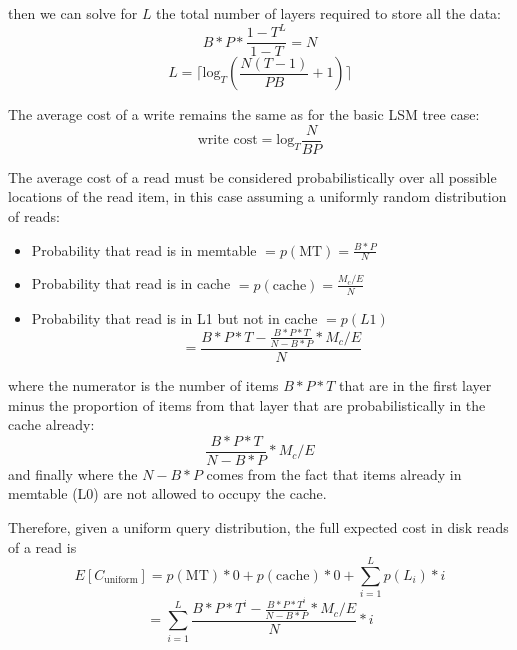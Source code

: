 \documentclass{sig-alternate-05-2015}
\begin{document}
\noindent then we can solve for $L$ the total number of layers required to store all the data: \\
$$B*P * \frac{1-T^L}{1-T} = N$$
$$L= \lceil \textrm{log}_{T} \left(\frac{N(T-1)}{PB} + 1\right) \rceil$$


The average cost of a write remains the same as for the basic LSM tree case:
$$
\text{write cost} = \textrm{log}_{T} \frac{N}{BP}
$$

The average cost of a read must be considered probabilistically over all possible locations of the read item, in this case assuming a uniformly random distribution of reads:
\begin{itemize}
\item Probability that read is in memtable $= p(\text{MT}) = \frac{B*P}{N}$
\item Probability that read is in cache $= p(\text{cache}) = \frac{M_c/E}{N}$
\item Probability that read is in L1 but not in cache $= p(L1)$ $$= \frac{B*P * T - \frac{B*P*T}{N-B*P} * M_c/E}{N}$$
\end{itemize}
where the numerator is the number of items $B*P*T$ that are in the first layer minus the proportion of items from that layer that are probabilistically in the cache already: $$\frac{B*P*T}{N-B*P} * M_c/E$$
and finally where the $N-B*P$ comes from the fact that items already in memtable (L0) are not allowed to occupy the cache.

Therefore, given a uniform query distribution, the full expected cost in disk reads of a read is
$$E[C_{\text{uniform}}] = p(\text{MT}) * 0  + p(\text{cache}) * 0 + \sum_{i=1}^L p(L_i) * i$$
$$=\sum_{i=1}^L \frac{B*P * T^i - \frac{B*P*T^i}{N-B*P} * M_c/E}{N} * i$$
\end{document}
